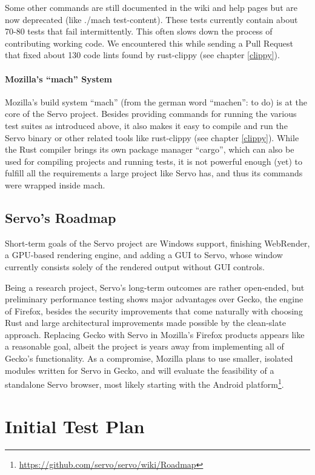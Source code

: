 \documentclass{scrartcl}
\begin{document}
Some other commands are still documented in the wiki and help pages but are now deprecated (like ./mach test-content). These tests currently contain about 70-80 tests that fail intermittently. This often slows down the process of contributing working code. We encountered this while sending a Pull Request that fixed about 130 code lints found by rust-clippy (see chapter \ref{clippy}).


\paragraph{Mozilla's ``mach'' System}
Mozilla's build system ``mach'' (from the german word ``machen'': to do) is at the core of the Servo project. Besides providing commands for running the various test suites as introduced above, it also makes it easy to compile and run the Servo binary or other related tools like rust-clippy (see chapter \ref{clippy}). While the Rust compiler brings its own package manager ``cargo'', which can also be used for compiling projects and running tests, it is not powerful enough (yet) to fulfill all the requirements a large project like Servo has, and thus its commands were wrapped inside mach.


\subsection{Servo's Roadmap}
Short-term goals of the Servo project are Windows support, finishing WebRender, a GPU-based rendering engine, and adding a GUI to Servo, whose window currently consists solely of the rendered output without GUI controls.
 
Being a research project, Servo's long-term outcomes are rather open-ended, but preliminary performance testing shows major advantages over Gecko, the engine of Firefox, besides the security improvements that come naturally with choosing Rust and large architectural improvements made possible by the clean-slate approach. Replacing Gecko with Servo in Mozilla's Firefox products appears like a reasonable goal, albeit the project is years away from implementing all of Gecko's functionality. As a compromise, Mozilla plans to use smaller, isolated modules written for Servo in Gecko, and will evaluate the feasibility of a standalone Servo browser, most likely starting with the Android platform\footnote{\url{https://github.com/servo/servo/wiki/Roadmap}}.


\newpage


\section{Initial Test Plan}
\end{document}
